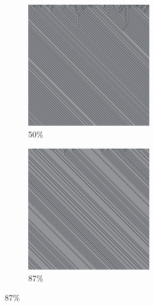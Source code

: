 \documentclass[12pt, fleqn]{report}                             %
\theoremstyle{break}                                            %
\begin{document}
\begin{figure}[ht!]
\begin{subfigure}[b]{0.4\linewidth}
          \includegraphics[width=0.6\textwidth]{Images/9/c.png}
          \caption{50\%}
        \end{subfigure}
        \begin{subfigure}[b]{0.4\linewidth}
          \includegraphics[width=0.6\textwidth]{Images/9/d.png}
          \caption{87\%}
        \end{subfigure}
      \end{figure}
\end{document}
